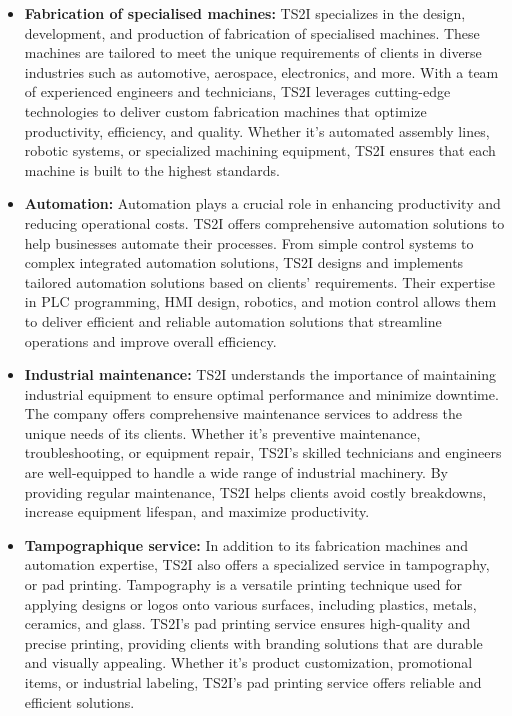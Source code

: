 \begin{itemize}

    \item \textbf{Fabrication of specialised machines:} TS2I specializes in the design, development,
    and production of fabrication of specialised machines. These machines are tailored to meet the
    unique requirements of clients in diverse industries such as automotive, aerospace, electronics,
    and more. With a team of experienced engineers and technicians, TS2I leverages cutting-edge
    technologies to deliver custom fabrication machines that optimize productivity, efficiency, and
    quality. Whether it's automated assembly lines, robotic systems, or specialized machining
    equipment, TS2I ensures that each machine is built to the highest standards.

    \item \textbf{Automation:} Automation plays a crucial role in enhancing productivity and reducing
    operational costs. TS2I offers comprehensive automation solutions to help businesses automate
    their processes. From simple control systems to complex integrated automation solutions, TS2I
    designs and implements tailored automation solutions based on clients' requirements. Their
    expertise in PLC programming, HMI design, robotics, and motion control allows them to deliver
    efficient and reliable automation solutions that streamline operations and improve overall
    efficiency.

    \item \textbf{Industrial maintenance:} TS2I understands the importance of maintaining industrial
    equipment to ensure optimal performance and minimize downtime. The company offers comprehensive
    maintenance services to address the unique needs of its clients. Whether it's preventive
    maintenance, troubleshooting, or equipment repair, TS2I's skilled technicians and engineers are
    well-equipped to handle a wide range of industrial machinery. By providing regular maintenance,
    TS2I helps clients avoid costly breakdowns, increase equipment lifespan, and maximize
    productivity.

    \item \textbf{Tampographique service:} In addition to its fabrication machines and automation
    expertise, TS2I also offers a specialized service in tampography, or pad printing. Tampography
    is a versatile printing technique used for applying designs or logos onto various surfaces,
    including plastics, metals, ceramics, and glass. TS2I's pad printing service ensures
    high-quality and precise printing, providing clients with branding solutions that are durable
    and visually appealing. Whether it's product customization, promotional items, or industrial
    labeling, TS2I's pad printing service offers reliable and efficient solutions.

\end{itemize}

